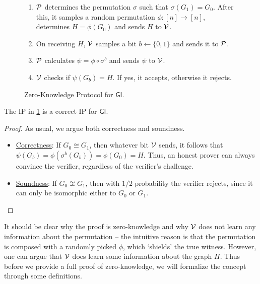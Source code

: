 \begin{figure}[h]
	\begin{mdframed}[
		linecolor=black,
		linewidth=1pt,
		roundcorner=5pt,
		backgroundcolor=white,
		userdefinedwidth=\textwidth,
		]
		\vspace{2mm}
		\begin{enumerate}
			\item $\mathcal{P}$ determines the permutation $\sigma$ such that $\sigma(G_1)=G_0$. After this, it samples a random permutation $\phi:[n]\rightarrow[n]$, determines $H=\phi(G_0)$ and sends $H$ to $\mathcal{V}$.
			\item On receiving $H$, $\mathcal{V}$ samples a bit $b\leftarrow\{0,1\}$ and sends it to $\mathcal{P}$.
			\item $\mathcal{P}$ calculates $\psi=\phi\circ\sigma^{b}$ and sends $\psi$ to $\mathcal{V}$.
			\item $\mathcal{V}$ checks if $\psi(G_b)=H$. If yes, it accepts, otherwise it rejects.
		\end{enumerate}
		\vspace{2mm}
	\end{mdframed}
	\caption{Zero-Knowledge Protocol for $\mathsf{GI}$.}
	\label{fig:zkgi}
\end{figure}

\begin{theorem}
	The IP in \ref{fig:zkgi} is a correct IP for $\mathsf{GI}$.
\end{theorem}
\begin{proof}
	As usual, we argue both correctness and soundness.
	\begin{itemize}
		\item\underline{Correctness}: If $G_0\cong G_1$, then whatever bit $\mathcal{V}$ sends, it follows that $\psi(G_b)=\phi(\sigma^b(G_b))=\phi(G_0)=H$. Thus, an honest prover can always convince the verifier, regardless of the verifier's challenge.
		\item\underline{Soundness}: If $G_0\not\cong G_1$, then with $1/2$ probability the verifier rejects, since it can only be isomorphic either to $G_0$ or $G_1$.
	\end{itemize}
\end{proof}

It should be clear why the proof is zero-knowledge and why $\mathcal{V}$ does not learn any information about the permutation -- the intuitive reason is that the permutation is composed with a randomly picked $\phi$, which `shields' the true witness. However, one can argue that $\mathcal{V}$ does learn some information about the graph $H$. Thus before we provide a full proof of zero-knowledge, we will formalize the concept through some definitions.

